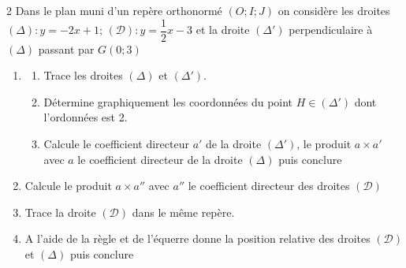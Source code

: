 \begin{multicols*}{2}
  	Dans le plan muni d'un repère orthonormé $ (O;I;J) $ on considère les droites $ (\Delta): y=-2x+1 $; $   \mathcal{(D)}: y=\dfrac{1}{2}x-3$ et la droite $ (\Delta') $ perpendiculaire à $ (\Delta) $ passant par $ G(0;3) $
  	\begin{enumerate}
  		\item 	\begin{enumerate} \item  Trace les droites $ ( \Delta) $ et $ (\Delta') $.
  			\item Détermine graphiquement les coordonnées du point $ H \in (\Delta')  $ dont l'ordonnées est 2.
  			\item Calcule le coefficient directeur $ a' $ de la droite $(\Delta') $, le produit $ a\times a' $  avec $ a $ le coefficient directeur de la droite  $ (\Delta) $ puis conclure 
  		\end{enumerate}
  		\item  Calcule le produit $ a\times a'' $  avec $ a'' $ le coefficient directeur des droites $ (\mathcal{D}) $
  		\item Trace la droite $ (\mathcal{D}) $ dans le même repère.
  		\item A l'aide de la règle et de l'équerre donne la position relative des droites $ (\mathcal{D}) $ et $ (\Delta) $ puis conclure 
  	\end{enumerate}
  	\dures
  	 
  	
  	

\end{multicols*}

